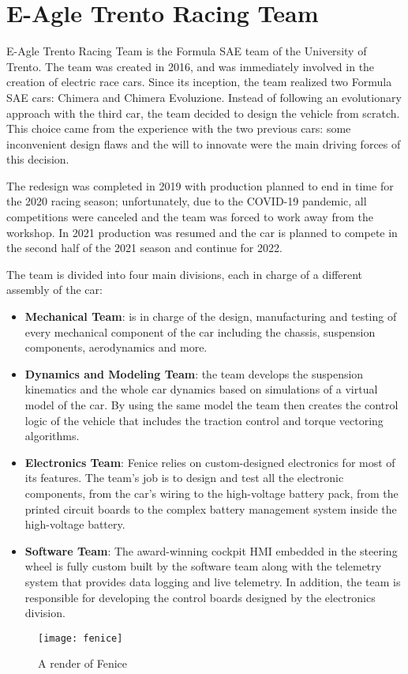 \section{E-Agle Trento Racing Team}
E-Agle Trento Racing Team is the Formula SAE team of the University of Trento. The team was created in 2016, and was immediately involved in the creation of electric race cars. Since its inception, the team realized two Formula SAE cars: Chimera and Chimera Evoluzione. Instead of following an evolutionary approach with the third car, the team decided to design the vehicle from scratch. This choice came from the experience with the two previous cars: some inconvenient design flaws and the will to innovate were the main driving forces of this decision.

The redesign was completed in 2019 with production planned to end in time for the 2020 racing season; unfortunately, due to the COVID-19 pandemic, all competitions were canceled and the team was forced to work away from the workshop. In 2021 production was resumed and the car is planned to compete in the second half of the 2021 season and continue for 2022.

The team is divided into four main divisions, each in charge of a different assembly of the car:
\begin{itemize}
    \item \textbf{Mechanical Team}: is in charge of the design, manufacturing and testing of every mechanical component of the car including the chassis, suspension components, aerodynamics and more.
    \item \textbf{Dynamics and Modeling Team}: the team develops the suspension kinematics and the whole car dynamics based on simulations of a virtual model of the car. By using the same model the team then creates the control logic of the vehicle that includes the traction control and torque vectoring algorithms.
    \item \textbf{Electronics Team}: Fenice relies on custom-designed electronics for most of its features. The team's job is to design and test all the electronic components, from the car's wiring to the high-voltage battery pack, from the printed circuit boards to the complex battery management system inside the high-voltage battery.
    \item \textbf{Software Team}: The award-winning cockpit HMI embedded in the steering wheel is fully custom built by the software team along with the telemetry system that provides data logging and live telemetry. In addition, the team is responsible for developing the control boards designed by the electronics division.
\end{itemize}

\begin{figure*}[h]
    \centering
    \texttt{[image: fenice]}
    \caption{A render of Fenice}
    \label{fig:fenice_render}
\end{figure*}

\newpage

